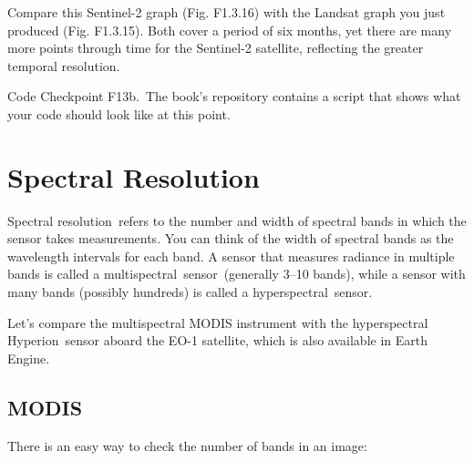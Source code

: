 \documentclass[
  letterpaper,
  DIV=11,
  numbers=noendperiod]{scrreprt}
\begin{document}
Compare this Sentinel-2 graph (Fig. F1.3.16) with the Landsat graph you
just produced (Fig. F1.3.15). Both cover a period of six months, yet
there are many more points through time for the Sentinel-2 satellite,
reflecting the greater temporal resolution.

\begin{tcolorbox}[enhanced jigsaw, left=2mm, breakable, rightrule=.15mm, opacityback=0, colframe=quarto-callout-note-color-frame, colbacktitle=quarto-callout-note-color!10!white, arc=.35mm, opacitybacktitle=0.6, toptitle=1mm, colback=white, leftrule=.75mm, title=\textcolor{quarto-callout-note-color}{\faInfo}\hspace{0.5em}{Note}, toprule=.15mm, bottomtitle=1mm, titlerule=0mm, bottomrule=.15mm, coltitle=black]

Code Checkpoint F13b.~The book's repository contains a script that shows
what your code should look like at this point.

\end{tcolorbox}

\hypertarget{spectral-resolution-1}{%
\section{Spectral Resolution}\label{spectral-resolution-1}}

Spectral resolution~refers to the number and width of spectral bands in
which the sensor takes measurements. You can think of the width of
spectral bands as the wavelength intervals for each band. A sensor that
measures radiance in multiple bands is called a
multispectral~sensor~(generally 3--10 bands), while a sensor with many
bands (possibly hundreds) is called a hyperspectral~sensor.

Let's compare the multispectral MODIS instrument with the hyperspectral
Hyperion~sensor aboard the EO-1 satellite, which is also available in
Earth Engine.

\hypertarget{modis}{%
\subsection{MODIS}\label{modis}}

There is an easy way to check the number of bands in an image:
\end{document}
